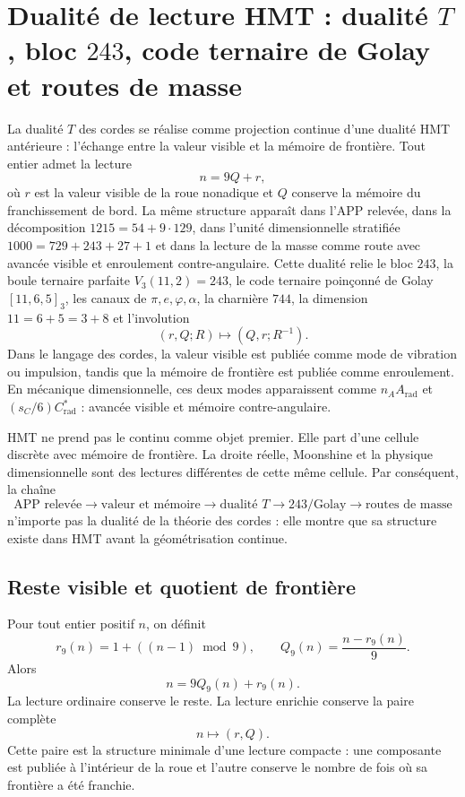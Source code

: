 \section{Dualité de lecture HMT : dualité \texorpdfstring{\(T\)}{T}, bloc \texorpdfstring{\(243\)}{243}, code ternaire de Golay et routes de masse}
\label{sec:sucesor83-f083-dualidad-t}

La dualité \(T\) des cordes se réalise comme projection continue d'une
dualité HMT antérieure : l'échange entre la valeur visible et la mémoire de
frontière. Tout entier admet la lecture
\[
n=9Q+r,
\]
où \(r\) est la valeur visible de la roue nonadique et \(Q\) conserve la
mémoire du franchissement de bord. La même structure apparaît dans l'APP relevée,
dans la décomposition \(1215=54+9\cdot129\), dans l'unité dimensionnelle
stratifiée \(1000=729+243+27+1\) et dans la lecture de la masse comme route avec
avancée visible et enroulement contre-angulaire. Cette dualité relie le bloc
\(243\), la boule ternaire parfaite \(V_3(11,2)=243\), le code ternaire
poinçonné de Golay \([11,6,5]_3\), les canaux de
\(\pi,e,\varphi,\alpha\), la charnière \(744\), la dimension
\(11=6+5=3+8\) et l'involution
\[
(r,Q;R)\longmapsto(Q,r;R^{-1}).
\]
Dans le langage des cordes, la valeur visible est publiée comme mode de vibration ou
impulsion, tandis que la mémoire de frontière est publiée comme enroulement.
En mécanique dimensionnelle, ces deux modes apparaissent comme
\(n_AA_{\mathrm{rad}}\) et \((s_C/6)C^*_{\mathrm{rad}}\) : avancée visible et
mémoire contre-angulaire.

HMT ne prend pas le continu comme objet premier. Elle part d'une cellule discrète
avec mémoire de frontière. La droite réelle, Moonshine et la physique dimensionnelle sont
des lectures différentes de cette même cellule. Par conséquent, la chaîne
\[
\text{APP relevée}
\longrightarrow\text{valeur et mémoire}
\longrightarrow\text{dualité }T
\longrightarrow243/\text{Golay}
\longrightarrow\text{routes de masse}
\]
n'importe pas la dualité de la théorie des cordes : elle montre que sa structure
existe dans HMT avant la géométrisation continue.

\subsection{Reste visible et quotient de frontière}

Pour tout entier positif \(n\), on définit
\[
r_9(n)=1+((n-1)\bmod 9),
\qquad
Q_9(n)=\frac{n-r_9(n)}{9}.
\]
Alors
\[
n=9Q_9(n)+r_9(n).
\]
La lecture ordinaire conserve le reste. La lecture enrichie conserve la
paire complète
\[
n\longmapsto(r,Q).
\]
Cette paire est la structure minimale d'une lecture compacte : une composante est
publiée à l'intérieur de la roue et l'autre conserve le nombre de fois où sa
frontière a été franchie.

